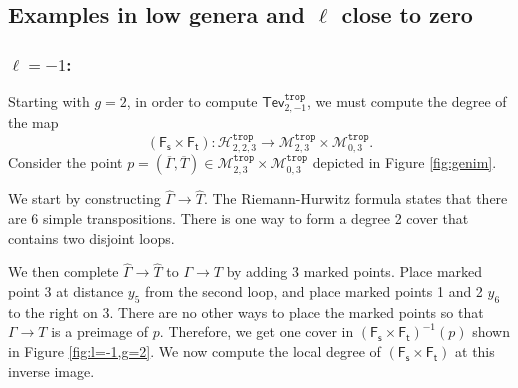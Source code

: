\documentclass[11pt,reqno]{amsart}
\theoremstyle{definition}
\newcommand\trop{{\mathtt{trop}}}
\newcommand\Mgn[1]{\mathcal M_{#1}}
\newcommand\Hur[1]{\mathcal H_{#1}}
\newcommand{\Ft}{\mathsf{F_t}}
\newcommand{\Fs}{\mathsf{F_s}}
\newcommand{\gGamma}{\widehat{\Gamma}}
\newcommand{\gT}{\widehat{T}}
\newcommand{\Tev}{{\mathsf{Tev}}}
\begin{document}
\subsection{Examples in low genera and $\ell$ close to zero}
\subsubsection{$\ell=-1$:} 

Starting with $g=2$, in order to compute $\Tev_{2,-1}^\trop$, we must compute the degree of the map \[(\Fs\times\Ft):\Hur{2,2,3}^\trop \to \Mgn{2,3}^\trop \times \Mgn{0,3}^\trop.\]
Consider the point $p=(\overline{\Gamma},\overline{T})\in \Mgn{2,3}^\trop \times \Mgn{0,3}^\trop$ depicted in Figure \ref{fig:genim}. 

We start by constructing $\gGamma \to \gT$. The Riemann-Hurwitz formula states that there are 6 simple transpositions. There is one way to form a degree 2 cover that contains two disjoint loops. 

We then complete $\gGamma \to \gT$ to $\Gamma \to T$ by adding 3 marked points. Place marked point 3 at distance $y_5$ from the second loop, and place marked points 1 and 2 $y_6$ to the right on 3. There are no other ways to place the marked points so that $\Gamma \to T$ is a preimage of $p$. Therefore, we get one cover in $(\Fs\times \Ft)^{-1}(p)$ shown in Figure \ref{fig:l=-1,g=2}. We now compute the local degree of $(\Fs\times\Ft)$ at this inverse image. 
\end{document}
